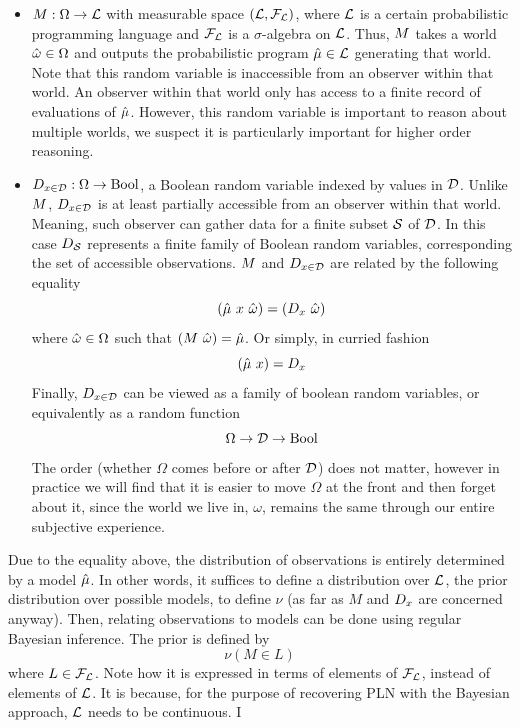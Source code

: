 \documentclass[]{article}
\begin{document}
\begin{itemize}
\item $M : \Omega \to \mathcal{L}$ with measurable space
  $(\mathcal{L}, \mathcal{F}_{\mathcal{L}})$, where $\mathcal{L}$ is a certain
  probabilistic programming language and $\mathcal{F}_{\mathcal{L}}$ is a
  $\sigma$-algebra on $\mathcal{L}$.  Thus, $M$ takes a world
  $\hat{\omega} \in \Omega$ and outputs the probabilistic program $\hat{\mu}
  \in \mathcal{L}$ generating that world.  Note that this random
  variable is inaccessible from an observer within that world.  An
  observer within that world only has access to a finite record of
  evaluations of $\hat{\mu}$.  However, this random variable is important
  to reason about multiple worlds, we suspect it is particularly
  important for higher order reasoning.
\item $D_{x\in\mathcal{D}} : \Omega \to \textup{Bool}$, a Boolean random variable indexed
  by values in $\mathcal{D}$.  Unlike $M$, $D_{x\in\mathcal{D}}$ is at least
  partially accessible from an observer within that world.  Meaning,
  such observer can gather data for a finite subset $\mathcal{S}$ of
  $\mathcal{D}$.  In this case $D_{\mathcal{S}}$ represents a finite family of
  Boolean random variables, corresponding the set of accessible
  observations.  $M$ and $D_{x\in\mathcal{D}}$ are related by the following
  equality
  $$(\anymu\ x\ \anyomega) = (\Datax\ \anyomega)$$ where $\hat{\omega}
  \in \Omega$ such that $(M\ \hat{\omega}) = \hat{\mu}$.  Or simply, in
  curried fashion
  $$(\hat{\mu}\ x) = D_{x}$$
  Finally, $D_{x\in\mathcal{D}}$ can be viewed as a family of boolean random
  variables, or equivalently as a random function
  $$\Omega \to \mathcal{D} \to \textup{Bool}$$
  The order (whether $\Omega$ comes before or after $\mathcal{D}$) does
  not matter, however in practice we will find that it is easier to
  move $\Omega$ at the front and then forget about it, since the world
  we live in, $\omega$, remains the same through our entire subjective
  experience.
\end{itemize}
Due to the equality above, the distribution of observations is
entirely determined by a model $\hat{\mu}$.  In other words, it suffices
to define a distribution over $\mathcal{L}$, the prior distribution over
possible models, to define $\nu$ (as far as $M$ and $D_{x}$ are
concerned anyway).  Then, relating observations to models can be done
using regular Bayesian inference.  The prior is defined by
$$\nu(M \in L)$$ where $L \in \mathcal{F}_{\mathcal{L}}$.  Note how it is
expressed in terms of elements of $\mathcal{F}_{\mathcal{L}}$, instead of
elements of $\mathcal{L}$.  It is because, for the purpose of recovering
PLN with the Bayesian approach, $\mathcal{L}$ needs to be continuous.  I
\end{document}
